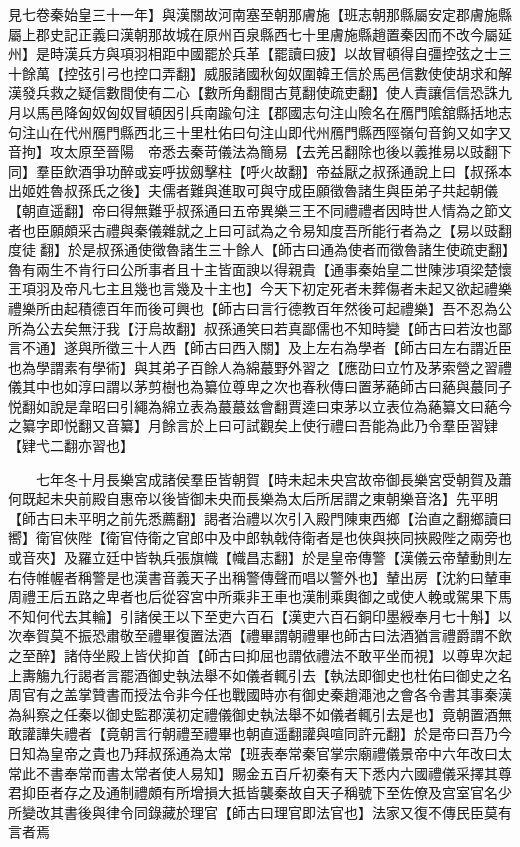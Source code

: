 見七卷秦始皇三十一年】與漢關故河南塞至朝那膚施【班志朝那縣屬安定郡膚施縣屬上郡史記正義曰漢朝那故城在原州百泉縣西七十里膚施縣趙置秦因而不改今屬延州】是時漢兵方與項羽相距中國罷於兵革【罷讀曰疲】以故冒頓得自彊控弦之士三十餘萬【控弦引弓也控口弄翻】威服諸國秋匈奴圍韓王信於馬邑信數使使胡求和解漢發兵救之疑信數間使有二心【數所角翻間古莧翻使疏吏翻】使人責讓信信恐誅九月以馬邑降匈奴匈奴冒頓因引兵南踰句注【郡國志句注山險名在鴈門隂舘縣括地志句注山在代州鴈門縣西北三十里杜佑曰句注山即代州鴈門縣西陘嶺句音鉤又如字又音拘】攻太原至晉陽　帝悉去秦苛儀法為簡易【去羌呂翻除也後以義推易以豉翻下同】羣臣飲酒爭功醉或妄呼拔劔擊柱【呼火故翻】帝益厭之叔孫通說上曰【叔孫本出姬姓魯叔孫氏之後】夫儒者難與進取可與守成臣願徵魯諸生與臣弟子共起朝儀【朝直遥翻】帝曰得無難乎叔孫通曰五帝異樂三王不同禮禮者因時世人情為之節文者也臣願頗采古禮與秦儀雜就之上曰可試為之令易知度吾所能行者為之【易以豉翻度徒翻】於是叔孫通使徵魯諸生三十餘人【師古曰通為使者而徵魯諸生使疏吏翻】魯有兩生不肯行曰公所事者且十主皆面諛以得親貴【通事秦始皇二世陳涉項梁楚懷王項羽及帝凡七主且幾也言幾及十主也】今天下初定死者未葬傷者未起又欲起禮樂禮樂所由起積德百年而後可興也【師古曰言行德教百年然後可起禮樂】吾不忍為公所為公去矣無汙我【汙烏故翻】叔孫通笑曰若真鄙儒也不知時變【師古曰若汝也鄙言不通】遂與所徵三十人西【師古曰西入關】及上左右為學者【師古曰左右謂近臣也為學謂素有學術】與其弟子百餘人為綿蕞野外習之【應劭曰立竹及茅索營之習禮儀其中也如淳曰謂以茅剪樹也為纂位尊卑之次也春秋傳曰置茅蕝師古曰蕝與蕞同子悦翻如說是韋昭曰引繩為綿立表為蕞蕞兹會翻賈逵曰束茅以立表位為蕝纂文曰蕝今之纂字即悦翻又音纂】月餘言於上曰可試觀矣上使行禮曰吾能為此乃令羣臣習肄【肄弋二翻亦習也】

　　七年冬十月長樂宮成諸侯羣臣皆朝賀【時未起未央宫故帝御長樂宮受朝賀及蕭何既起未央前殿自惠帝以後皆御未央而長樂為太后所居謂之東朝樂音洛】先平明【師古曰未平明之前先悉薦翻】謁者治禮以次引入殿門陳東西鄉【治直之翻鄉讀曰嚮】衛官俠陛【衛官侍衛之官郎中及中郎執戟侍衛者是也俠與挾同挾殿陛之兩旁也或音夾】及羅立廷中皆執兵張旗幟【幟昌志翻】於是皇帝傳警【漢儀云帝輦動則左右侍帷幄者稱警是也漢書音義天子出稱警傳聲而唱以警外也】輦出房【沈約曰輦車周禮王后五路之卑者也后從容宮中所乘非王車也漢制乘輿御之或使人輓或駕果下馬不知何代去其輪】引諸侯王以下至吏六百石【漢吏六百石銅印墨綬奉月七十斛】以次奉賀莫不振恐肅敬至禮畢復置法酒【禮畢謂朝禮畢也師古曰法酒猶言禮爵謂不飲之至醉】諸侍坐殿上皆伏抑首【師古曰抑屈也謂依禮法不敢平坐而視】以尊卑次起上夀觴九行謁者言罷酒御史執法舉不如儀者輒引去【執法即御史也杜佑曰御史之名周官有之盖掌贊書而授法令非今任也戰國時亦有御史秦趙澠池之會各令書其事秦漢為糾察之任秦以御史監郡漢初定禮儀御史執法舉不如儀者輒引去是也】竟朝置酒無敢讙譁失禮者【竟朝言行朝禮至禮畢也朝直遥翻讙與喧同許元翻】於是帝曰吾乃今日知為皇帝之貴也乃拜叔孫通為太常【班表奉常秦官掌宗廟禮儀景帝中六年改曰太常此不書奉常而書太常者使人易知】賜金五百斤初秦有天下悉内六國禮儀采擇其尊君抑臣者存之及通制禮頗有所增損大抵皆襲秦故自天子稱號下至佐僚及宫室官名少所變改其書後與律令同錄藏於理官【師古曰理官即法官也】法家又復不傳民臣莫有言者焉

